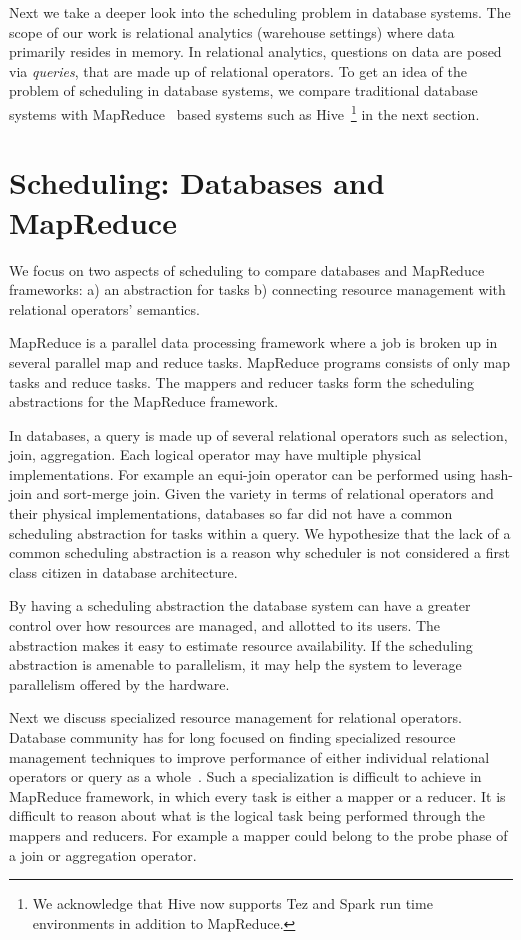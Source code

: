 Next we take a deeper look into the scheduling problem in database systems.
The scope of our work is relational analytics (warehouse settings) where data primarily resides in memory. 
In relational analytics, questions on data are posed via \textit{queries}, that are made up of relational operators. 
To get an idea of the problem of scheduling in database systems, we compare traditional database systems with MapReduce~\cite{mapreduce} based systems such as Hive~\cite{thusoo2010hive}\footnote{We acknowledge that Hive now supports Tez and Spark run time environments in addition to MapReduce.} in the next section.

\section{Scheduling: Databases and MapReduce}
We focus on two aspects of scheduling to compare databases and MapReduce frameworks: a) an abstraction for tasks b) connecting resource management with relational operators' semantics.

MapReduce is a parallel data processing framework where a job is broken up in several parallel map and reduce tasks. 
MapReduce programs consists of only map tasks and reduce tasks.
The mappers and reducer tasks form the scheduling abstractions for the MapReduce framework.

In databases, a query is made up of several relational operators such as selection, join, aggregation. 
Each logical operator may have multiple physical implementations. 
For example an equi-join operator can be performed using hash-join and sort-merge join.
Given the variety in terms of relational operators and their physical implementations, databases so far did not have a common scheduling abstraction for tasks within a query. 
We hypothesize that the lack of a common scheduling abstraction is a reason why scheduler is not considered a first class citizen in database architecture.

By having a scheduling abstraction the database system can have a greater control over how resources are managed, and allotted to its users.
The abstraction makes it easy to estimate resource availability.
If the scheduling abstraction is amenable to parallelism, it may help the system to leverage parallelism offered by the hardware. 

Next we discuss specialized resource management for relational operators. 
Database community has for long focused on finding specialized resource management techniques to improve performance of either individual relational operators or query as a whole~\cite{davison1995dynamic, Bouganim:1998:MSL:288627.288646, memory-hash-ibm, mehta1993dynamic, DBLP:conf/cikm/NagD98}.
Such a specialization is difficult to achieve in MapReduce framework, in which every task is either a mapper or a reducer.
It is difficult to reason about what is the logical task being performed through the mappers and reducers. 
For example a mapper could belong to the probe phase of a join or aggregation operator. 

